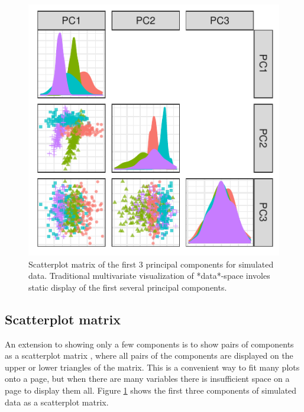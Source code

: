\documentclass{monashthesis}
\begin{document}
\begin{figure}

{\centering \includegraphics[width=1\linewidth,]{./figures_from_script/ch4_fig1_pca_splom} 

}

\caption{Scatterplot matrix of the first 3 principal components for simulated data. Traditional multivariate visualization of *data*-space involes static display of the first several principal components.}\label{fig:ch4fig1}
\end{figure}

\hypertarget{scatterplot-matrix}{%
\subsection{Scatterplot matrix}\label{scatterplot-matrix}}

An extension to showing only a few components is to show pairs of components as a scatterplot matrix \autocite{chambers_graphical_1983}, where all pairs of the components are displayed on the upper or lower triangles of the matrix. This is a convenient way to fit many plots onto a page, but when there are many variables there is insufficient space on a page to display them all. Figure \ref{fig:ch4fig1} shows the first three components of simulated data as a scatterplot matrix.
\end{document}
